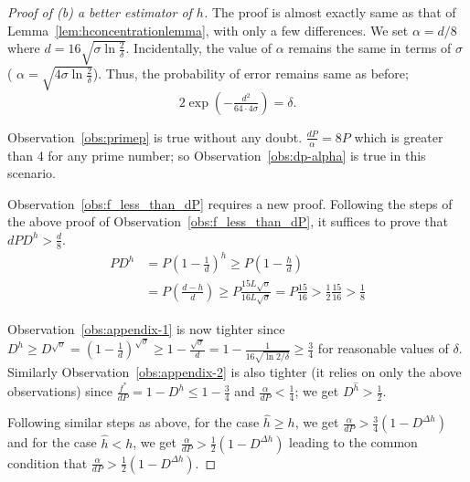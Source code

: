 \begin{proof}[Proof of (b) a better estimator of $h$]
    The proof is almost exactly same as that of
    Lemma~\ref{lem:hconcentrationlemma}, with only a few differences. We set
    $\alpha=d/8$ where $d=16\sqrt{\sigma \ln \tfrac{2}{\delta}}$. Incidentally,
    the value of $\alpha$ remains the same in terms of $\sigma$ ( $\alpha=\sqrt{4\sigma
    \ln \tfrac{2}{\delta}}$). Thus, the
    probability of error remains same as before;
    $$2 \exp{(-\tfrac{d^2}{64 \cdot 4 \sigma})} = \delta.$$

    Observation~\ref{obs:primep} is true without any doubt.
    $\tfrac{dP}{\alpha} = 8P$ which is greater than 4 for any prime number; so
    Observation~\ref{obs:dp-alpha} is true in this scenario.

    Observation~\ref{obs:f_less_than_dP} requires a new proof. Following the steps of the above proof of Observation~\ref{obs:f_less_than_dP}, it suffices to prove that $dPD^h > \tfrac{d}{8}$.
    \begin{align*}
	PD^h & = P(1-\tfrac{1}{d})^h \ge P(1-\tfrac{h}{d}) \\
	     & =P(\tfrac{d-h}{d}) \ge P\tfrac{15L\sqrt{\sigma}}{16L\sqrt{\sigma}} = P\tfrac{15}{16} > \tfrac{1}{2}\tfrac{15}{16} > \tfrac{1}{8}
    \end{align*}

    Observation~\ref{obs:appendix-1} is now tighter since $D^h \ge D^{\sqrt{\sigma}}
    = (1-\tfrac{1}{d})^{\sqrt{\sigma}} \ge 1-\tfrac{\sqrt{\sigma}}{d} = 1 -
    \tfrac{1}{16\sqrt{\ln 2/\delta}} \ge \tfrac{3}{4}$ for reasonable values of
    $\delta$.
    Similarly Observation~\ref{obs:appendix-2} is also tighter (it relies on only the above
    observations) since $\tfrac{f^*}{dP} = 1 - D^h \le 1-\tfrac{3}{4}$ and $\tfrac{\alpha}{dP} < \tfrac{1}{4}$; we get $D^{\hat{h}} > \tfrac{1}{2}$.

    Following similar steps as above, for the case $\hat{h} \ge h$, we get $\tfrac{\alpha}{dP} > \tfrac{3}{4}(1-D^{\Delta h})$ and for the case $\hat{h} < h$, we get $\tfrac{\alpha}{dP} > \tfrac{1}{2}(1-D^{\Delta h})$ leading to the common condition that $\tfrac{\alpha}{dP} > \tfrac{1}{2}(1-D^{\Delta h})$.


\end{proof}
